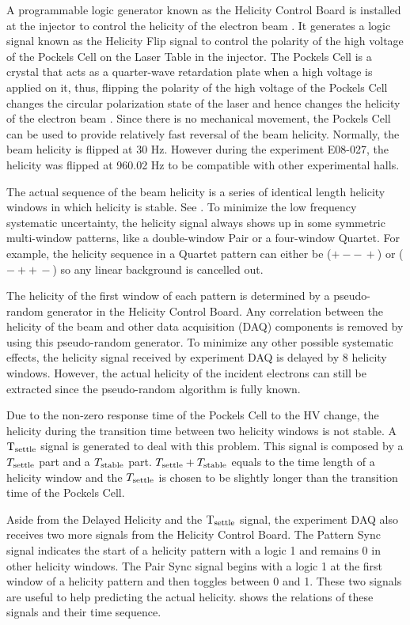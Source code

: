 A programmable logic generator known as the Helicity Control Board is installed at the injector to control the helicity of the electron beam \cite{Flood2010}. It generates a logic signal known as the Helicity Flip signal to control the polarity of the high voltage of the Pockels Cell on the Laser Table in the injector. The Pockels Cell is a crystal that acts as a quarter-wave retardation plate when a high voltage is applied on it, thus, flipping the polarity of the high voltage of the Pockels Cell changes the circular polarization state of the laser and hence changes the helicity of the electron beam \cite{Hansknecht2007}. Since there is no mechanical movement, the Pockels Cell can be used to provide relatively fast reversal of the beam helicity. Normally, the beam helicity is flipped at 30 Hz. However during the experiment E08-027, the helicity was flipped at 960.02 Hz to be compatible with other experimental halls.

The actual sequence of the beam helicity is a series of identical length helicity windows in which helicity is stable. See . To minimize the low frequency systematic uncertainty, the helicity signal always shows up in some symmetric multi-window patterns, like a double-window Pair or a four-window Quartet. For example, the helicity sequence in a Quartet pattern can either be ($+--\,+$) or ($-++\,-$) so any linear background is cancelled out.

The helicity of the first window of each pattern is determined by a pseudo-random generator in the Helicity Control Board. Any correlation between the helicity of the beam and other data acquisition (DAQ) components is removed by using this pseudo-random generator. To minimize any other possible systematic effects, the helicity signal received by experiment DAQ is delayed by 8 helicity windows. However, the actual helicity of the incident electrons can still be extracted since the pseudo-random algorithm is fully known.

Due to the non-zero response time of the Pockels Cell to the HV change, the helicity during the transition time between two helicity windows is not stable. A $\mathrm{T}_{\mathrm{settle}}$ signal is generated to deal with this problem. This signal is composed by a $T_{\mathrm{settle}}$ part and a $T_{\mathrm{stable}}$ part. $T_{\mathrm{settle}}+T_{\mathrm{stable}}$ equals to the time length of a helicity window and the $T_{\mathrm{settle}}$ is chosen to be slightly longer than the transition time of the Pockels Cell.

Aside from the Delayed Helicity and the $\mathrm{T}_{\mathrm{settle}}$ signal, the experiment DAQ also receives two more signals from the Helicity Control Board. The Pattern Sync signal indicates the start of a helicity pattern with a logic 1 and remains 0 in other helicity windows. The Pair Sync signal begins with a logic 1 at the first window of a helicity pattern and then toggles between 0 and 1. These two signals are useful to help predicting the actual helicity.  shows the relations of these signals and their time sequence.

